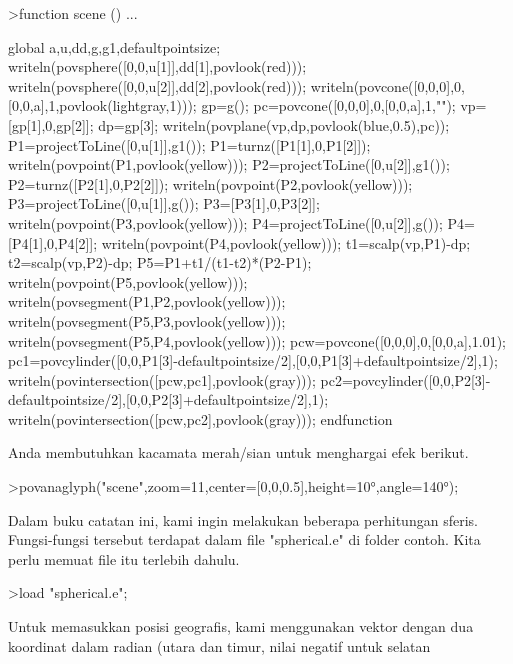 \documentclass{article}
\begin{document}
\begin{eulernotebook}
\begin{eulercomment}
\begin{eulercomment}
\begin{eulercomment}
\begin{eulercomment}
\begin{eulerprompt}
>function scene () ...
\end{eulerprompt}
\begin{eulerudf}
  global a,u,dd,g,g1,defaultpointsize;
  writeln(povsphere([0,0,u[1]],dd[1],povlook(red)));
  writeln(povsphere([0,0,u[2]],dd[2],povlook(red)));
  writeln(povcone([0,0,0],0,[0,0,a],1,povlook(lightgray,1)));
  gp=g();
  pc=povcone([0,0,0],0,[0,0,a],1,"");
  vp=[gp[1],0,gp[2]]; dp=gp[3];
  writeln(povplane(vp,dp,povlook(blue,0.5),pc));
  P1=projectToLine([0,u[1]],g1()); P1=turnz([P1[1],0,P1[2]]);
  writeln(povpoint(P1,povlook(yellow)));
  P2=projectToLine([0,u[2]],g1()); P2=turnz([P2[1],0,P2[2]]);
  writeln(povpoint(P2,povlook(yellow)));
  P3=projectToLine([0,u[1]],g()); P3=[P3[1],0,P3[2]];
  writeln(povpoint(P3,povlook(yellow)));
  P4=projectToLine([0,u[2]],g()); P4=[P4[1],0,P4[2]];
  writeln(povpoint(P4,povlook(yellow)));
  t1=scalp(vp,P1)-dp; t2=scalp(vp,P2)-dp; P5=P1+t1/(t1-t2)*(P2-P1);
  writeln(povpoint(P5,povlook(yellow)));
  writeln(povsegment(P1,P2,povlook(yellow)));
  writeln(povsegment(P5,P3,povlook(yellow)));
  writeln(povsegment(P5,P4,povlook(yellow)));
  pcw=povcone([0,0,0],0,[0,0,a],1.01);
  pc1=povcylinder([0,0,P1[3]-defaultpointsize/2],[0,0,P1[3]+defaultpointsize/2],1);
  writeln(povintersection([pcw,pc1],povlook(gray)));
  pc2=povcylinder([0,0,P2[3]-defaultpointsize/2],[0,0,P2[3]+defaultpointsize/2],1);
  writeln(povintersection([pcw,pc2],povlook(gray)));
  endfunction
\end{eulerudf}
\begin{eulercomment}
Anda membutuhkan kacamata merah/sian untuk menghargai efek berikut.
\end{eulercomment}
\begin{eulerprompt}
>povanaglyph("scene",zoom=11,center=[0,0,0.5],height=10°,angle=140°);
\end{eulerprompt}
\begin{eulercomment}
Dalam buku catatan ini, kami ingin melakukan beberapa perhitungan
sferis. Fungsi-fungsi tersebut terdapat dalam file "spherical.e" di
folder contoh. Kita perlu memuat file itu terlebih dahulu.
\end{eulercomment}
\begin{eulerprompt}
>load "spherical.e";
\end{eulerprompt}
\begin{eulercomment}
Untuk memasukkan posisi geografis, kami menggunakan vektor dengan dua
koordinat dalam radian (utara dan timur, nilai negatif untuk selatan

\end{eulercomment}
\end{eulercomment}
\end{eulercomment}
\end{eulercomment}
\end{eulercomment}
\end{eulernotebook}
\end{document}
